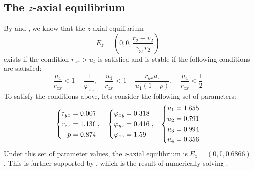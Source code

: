 \subsection{The $z$-axial equilibrium}\label{subsec:numsim_z_axial_equilibrium}
By  and , we know that the $z$-axial equilibrium
\begin{equation*}
    E_z=\left(0,0,\frac{r_2-v_2}{\gamma_{31}r_2}\right)
\end{equation*}
exists if the condition $r_{zx} > u_4$ is satisfied and is stable if the following conditions are satisfied:
\begin{equation*}
    \frac{u_4}{r_{zx}} < 1-\frac{1}{\varphi_{xz}},\quad
    \frac{u_4}{r_{zx}} < 1-\frac{r_{yx}u_2}{u_1\left(1-p\right)},\quad
    \frac{u_4}{r_{zx}} < \frac{1}{2}
\end{equation*}
To satisfy the conditions above, lets consider the following set of parameters:
\begin{equation}\label{params:axial-z}
    \begin{dcases}
        \begin{aligned}
            r_{yx} &= 0.007\\
            r_{zx} &= 1.136\\
            p &= 0.874
        \end{aligned}
    \end{dcases},\quad 
    \begin{dcases}
        \begin{aligned}
            \varphi_{xy} &= 0.318\\
            \varphi_{yx} &= 0.416\\
            \varphi_{xz} &= 1.59
        \end{aligned}
    \end{dcases},\quad 
    \begin{dcases}
        \begin{aligned}
            u_1 &= 1.655\\
            u_2 &= 0.791\\
            u_3 &= 0.994\\
            u_4 &= 0.356
        \end{aligned}
    \end{dcases}
\end{equation}
Under this set of parameter values, the $z$-axial equilibrium is $E_z=(0,0,0.6866)$.
This is further supported by , which is the result of numerically solving .
